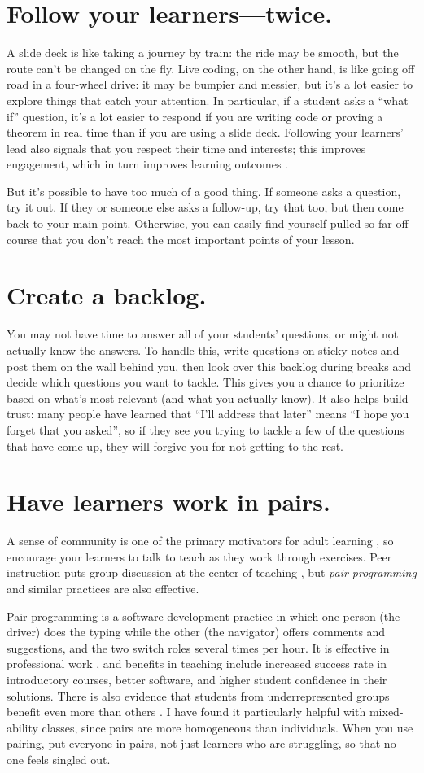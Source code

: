 \documentclass[10pt,letterpaper]{article}
\newcommand{\rulemajor}[1]{\section{#1}}
\begin{document}
\rulemajor{Follow your learners---twice.}

A slide deck is like taking a journey by train:
the ride may be smooth,
but the route can't be changed on the fly.
Live coding,
on the other hand,
is like going off road in a four-wheel drive:
it may be bumpier and messier,
but it's a lot easier to explore things that catch your attention.
In particular,
if a student asks a ``what if'' question,
it's a lot easier to respond if you are writing code or proving a theorem in real time
than if you are using a slide deck.
Following your learners' lead also signals that you respect their time and interests;
this improves engagement,
which in turn improves learning outcomes \cite{Wlod2017}.

But it's possible to have too much of a good thing.
If someone asks a question, try it out.
If they or someone else asks a follow-up,
try that too,
but then come back to your main point.
Otherwise,
you can easily find yourself pulled so far off course that
you don't reach the most important points of your lesson.

\rulemajor{Create a backlog.}

You may not have time to answer all of your students' questions,
or might not actually know the answers.
To handle this,
write questions on sticky notes and post them on the wall behind you,
then look over this backlog during breaks and decide which questions you want to tackle.
This gives you a chance to prioritize based on what's most relevant (and what you actually know).
It also helps build trust:
many people have learned that ``I'll address that later''
means ``I hope you forget that you asked'',
so if they see you trying to tackle a few of the questions that have come up,
they will forgive you for not getting to the rest.

\rulemajor{Have learners work in pairs.}

A sense of community is one of the primary motivators for adult learning \cite{Wlod2017},
so encourage your learners to talk to teach as they work through exercises.
Peer instruction puts group discussion at the center of teaching \cite{Crou2001,Smit2009,Port2016},
but \emph{pair programming} and similar practices are also effective.

Pair programming is a software development practice
in which one person (the driver) does the typing
while the other (the navigator) offers comments and suggestions,
and the two switch roles several times per hour.
It is effective in professional work \cite{Hann2009},
and benefits in teaching include increased success rate in introductory courses,
better software,
and higher student confidence in their solutions.
There is also evidence that students from underrepresented groups
benefit even more than others \cite{McDo2006,Hank2011,Cele2018}.
I have found it particularly helpful with mixed-ability classes,
since pairs are more homogeneous than individuals.
When you use pairing,
put everyone in pairs,
not just learners who are struggling,
so that no one feels singled out.
\end{document}

